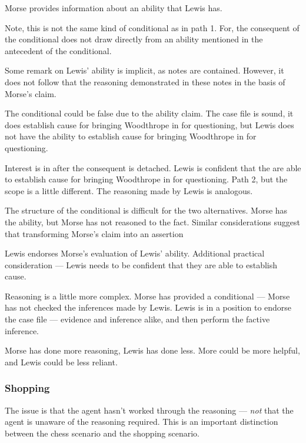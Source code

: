 \documentclass[10pt]{article}
\begin{document}
Morse provides information about an ability that Lewis has.


Note, this is not the same kind of conditional as in path 1.
For, the consequent of the conditional does not draw directly from an ability mentioned in the antecedent of the conditional.

Some remark on Lewis' ability is implicit, as notes are contained.
However, it does not follow that the reasoning demonstrated in these notes in the basis of Morse's claim.

The conditional could be false due to the ability claim.
The case file is sound, it does establish cause for bringing Woodthrope in for questioning, but Lewis does not have the ability to establish cause for bringing Woodthrope in for questioning.

Interest is in after the consequent is detached.
Lewis is confident that the are able to establish cause for bringing Woodthrope in for questioning.
Path 2, but the scope is a little different.
The reasoning made by Lewis is analogous.

The structure of the conditional is difficult for the two alternatives.
Morse has the ability, but Morse has not reasoned to the fact.
Similar considerations suggest that transforming Morse's claim into an assertion 

Lewis endorses Morse's evaluation of Lewis' ability.
Additional practical consideration --- Lewis needs to be confident that they are able to establish cause.



Reasoning is a little more complex.
Morse has provided a conditional --- Morse has not checked the inferences made by Lewis.
Lewis is in a position to endorse the case file --- evidence and inference alike, and then perform the factive inference.







Morse has done more reasoning, Lewis has done less.
More could be more helpful, and Lewis could be less reliant.



\subsubsection{Shopping}
\label{sec:shopping}



\begin{note}
   The issue is that the agent hasn't worked through the reasoning --- \emph{not} that the agent is unaware of the reasoning required.
  This is an important distinction between the chess scenario and the shopping scenario.
\end{note}
\end{document}
